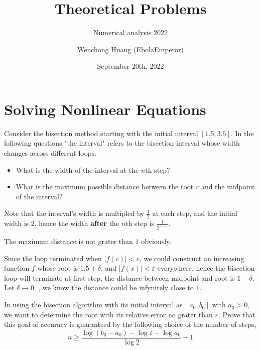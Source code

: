 \documentclass[11pt]{elegantbook}
\title{Theoretical Problems}
\subtitle{Numerical analysis 2022}
\author{Wenchong Huang (EbolaEmperor)}
\institute{School of Mathematical Science, Zhejiang University}
\date{September 20th, 2022}
\begin{document}
\maketitle

\frontmatter

\mainmatter

\chapter{Solving Nonlinear Equations}

\begin{problem}
  Consider the bisection method starting with the initial interval $[1.5,3.5]$. In the following questions "the interval" refers to the bisection interval whose width changes across different loops.
  \begin{itemize}
    \item What is the width of the interval at the $n$th step?
    \item What is the maximum possible distance between the root $r$ and the midpoint of the interval?
  \end{itemize}
\end{problem}

\begin{solution}
  Note that the interval's width is multipled by $\frac{1}{2}$ at each step, and the initial width is $2$, hence the width \textbf{after} the $n$th step is $\frac{1}{2^{n-1}}$.
  
  The maximum distance is not grater than $1$ obviously.

  Since the loop terminated when $|f(c)|<\varepsilon$, we could construct an increasing function $f$ whose root is $1.5+\delta$, and $|f(x)|<\varepsilon$ everywhere, hence the bisection loop will terminate at first step, the distance between midpoint and root is $1-\delta$. Let $\delta\to 0^+$, we know the distance could be infynitely close to $1$.
\end{solution}

\vspace{1.5em}

\begin{problem}
  In using the bisection algorithm with its initial interval as $[a_0,b_0]$ with $a_0>0$, we want to determine the root with its relative error no grater than $\varepsilon$. Prove that this goal of accuracy is guaranteed by the following choice of the number of steps,
  \begin{equation*}
    n\geq\frac{\log(b_0-a_0)-\log\varepsilon-\log a_0}{\log 2}-1
  \end{equation*}
\end{problem}
\end{document}
